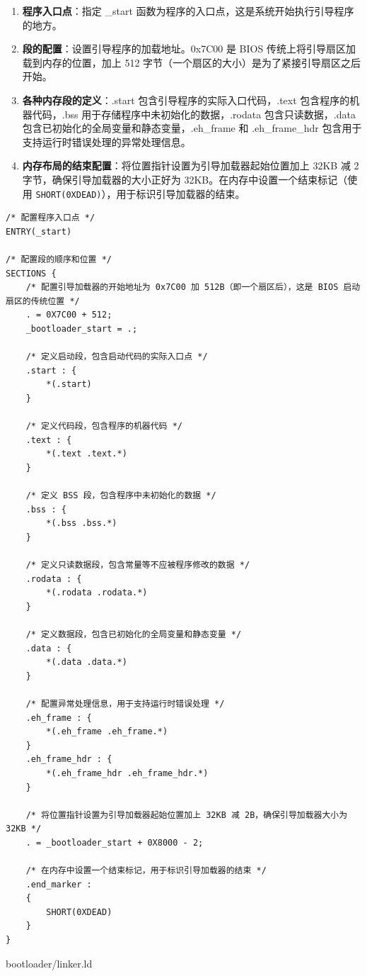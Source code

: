 \begin{enumerate}
    \item \textbf{程序入口点}：指定 \_start 函数为程序的入口点，这是系统开始执行引导程序的地方。
    \item \textbf{段的配置}：设置引导程序的加载地址。0x7C00 是 BIOS 传统上将引导扇区加载到内存的位置，加上 512 字节（一个扇区的大小）是为了紧接引导扇区之后开始。
    \item \textbf{各种内存段的定义}：.start 包含引导程序的实际入口代码，.text 包含程序的机器代码，.bss 用于存储程序中未初始化的数据，.rodata 包含只读数据，.data 包含已初始化的全局变量和静态变量，.eh\_frame 和 .eh\_frame\_hdr 包含用于支持运行时错误处理的异常处理信息。
    \item \textbf{内存布局的结束配置}：将位置指针设置为引导加载器起始位置加上 32KB 减 2 字节，确保引导加载器的大小正好为 32KB。在内存中设置一个结束标记（使用 \texttt{SHORT(0XDEAD)}），用于标识引导加载器的结束。
\end{enumerate}

\begin{listing}[htbp]
    \begin{verbatim}
/* 配置程序入口点 */
ENTRY(_start)

/* 配置段的顺序和位置 */
SECTIONS {
    /* 配置引导加载器的开始地址为 0x7C00 加 512B（即一个扇区后），这是 BIOS 启动扇区的传统位置 */
    . = 0X7C00 + 512;
    _bootloader_start = .;

    /* 定义启动段，包含启动代码的实际入口点 */
    .start : {
        *(.start)
    }

    /* 定义代码段，包含程序的机器代码 */
    .text : {
        *(.text .text.*)
    }

    /* 定义 BSS 段，包含程序中未初始化的数据 */
    .bss : {
        *(.bss .bss.*)
    }

    /* 定义只读数据段，包含常量等不应被程序修改的数据 */
    .rodata : {
        *(.rodata .rodata.*)
    }

    /* 定义数据段，包含已初始化的全局变量和静态变量 */
    .data : {
        *(.data .data.*)
    }

    /* 配置异常处理信息，用于支持运行时错误处理 */
    .eh_frame : {
        *(.eh_frame .eh_frame.*)
    }
    .eh_frame_hdr : {
        *(.eh_frame_hdr .eh_frame_hdr.*)
    }

    /* 将位置指针设置为引导加载器起始位置加上 32KB 减 2B，确保引导加载器大小为 32KB */
    . = _bootloader_start + 0X8000 - 2;

    /* 在内存中设置一个结束标记，用于标识引导加载器的结束 */
    .end_marker :
    {
        SHORT(0XDEAD)
    }
}
    \end{verbatim}
    \caption{bootloader/linker.ld}\label{lst:BootloaderLinkerScript}
\end{listing}


